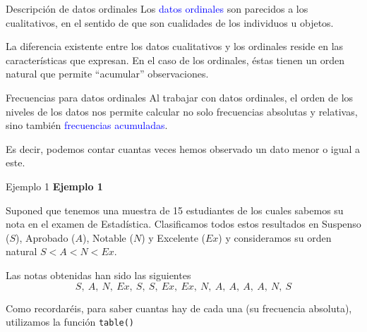 \documentclass[
  ignorenonframetext,
  aspectratio=169]{beamer}
\newcommand\blue[1]{\textcolor{blue}{#1}}
\begin{document}
\begin{frame}{Descripción de datos ordinales}
\label{descripciuxf3n-de-datos-ordinales}
Los \blue{datos ordinales} son parecidos a los cualitativos, en el
sentido de que son cualidades de los individuos u objetos.

La diferencia existente entre los datos cualitativos y los ordinales
reside en las características que expresan. En el caso de los ordinales,
éstas tienen un orden natural que permite ``acumular'' observaciones.
\end{frame}

\begin{frame}{Frecuencias para datos ordinales}
\label{frecuencias-para-datos-ordinales}
Al trabajar con datos ordinales, el orden de los niveles de los datos
nos permite calcular no solo frecuencias absolutas y relativas, sino
también \blue{frecuencias acumuladas}.

Es decir, podemos contar cuantas veces hemos observado un dato menor o
igual a este.
\end{frame}

\begin{frame}[fragile]{Ejemplo 1}
\label{ejemplo-1}
\textbf{Ejemplo 1}

Suponed que tenemos una muestra de 15 estudiantes de los cuales sabemos
su nota en el examen de Estadística. Clasificamos todos estos resultados
en Suspenso (\(S\)), Aprobado (\(A\)), Notable (\(N\)) y Excelente
(\(Ex\)) y consideramos su orden natural \(S<A<N<Ex\).

Las notas obtenidas han sido las siguientes
\[S,\ A,\ N,\ Ex,\ S,\ S,\ Ex,\ Ex,\ N,\ A,\ A,\ A,\ A,\ N,\ S\]

Como recordaréis, para saber cuantas hay de cada una (su frecuencia
absoluta), utilizamos la función \texttt{table()}
\end{frame}
\end{document}
